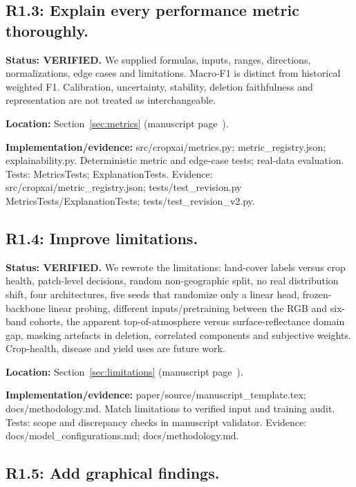 \documentclass[3p,times,procedia]{elsarticle}
\begin{document}
\subsection*{R1.3: Explain every performance metric thoroughly.}

\textbf{Status: VERIFIED.} We supplied formulas, inputs, ranges, directions, normalizations, edge cases and limitations. Macro-F1 is distinct from historical weighted F1. Calibration, uncertainty, stability, deletion faithfulness and representation are not treated as interchangeable.

\par\textbf{Location:} Section~\ref{sec:metrics} (manuscript page~\pageref{sec:metrics}).

\par\textbf{Implementation/evidence:} src/cropxai/metrics.py; metric\_registry.json; explainability.py. Deterministic metric and edge-case tests; real-data evaluation. Tests: MetricsTests; ExplanationTests. Evidence: src/cropxai/metric\_registry.json; tests/test\_revision.py MetricsTests/ExplanationTests; tests/test\_revision\_v2.py.

\subsection*{R1.4: Improve limitations.}

\textbf{Status: VERIFIED.} We rewrote the limitations: land-cover labels versus crop health, patch-level decisions, random non-geographic split, no real distribution shift, four architectures, five seeds that randomize only a linear head, frozen-backbone linear probing, different inputs/pretraining between the RGB and six-band cohorts, the apparent top-of-atmosphere versus surface-reflectance domain gap, masking artefacts in deletion, correlated components and subjective weights. Crop-health, disease and yield uses are future work.

\par\textbf{Location:} Section~\ref{sec:limitations} (manuscript page~\pageref{sec:limitations}).

\par\textbf{Implementation/evidence:} paper/source/manuscript\_template.tex; docs/methodology.md. Match limitations to verified input and training audit. Tests: scope and discrepancy checks in manuscript validator. Evidence: docs/model\_configurations.md; docs/methodology.md.

\subsection*{R1.5: Add graphical findings.}
\end{document}
